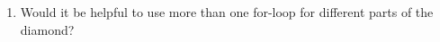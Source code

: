 \documentclass[12pt]{article}
\begin{document}
\begin{enumerate}


\item Would it be helpful to use more than one for-loop for different parts of the diamond?
\end{enumerate}

\end{document}
